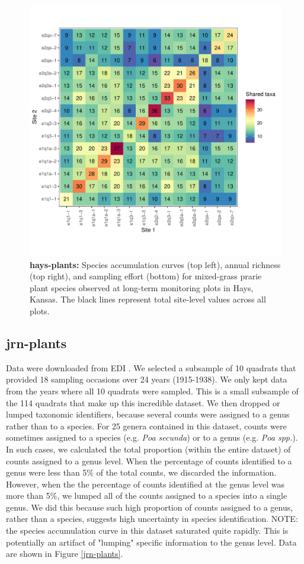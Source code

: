 \documentclass[11pt, oneside]{article}
\begin{document}
\begin{figure}[h!]
\includegraphics[scale = 0.4]{hays-plants-compagnoni_spp_shared.pdf}
\caption{{\bf hays-plants:} Species accumulation curves (top left),  annual richness (top right), and sampling effort (bottom)  for mixed-grass prarie plant species observed at long-term monitoring plots in Hays, Kansas. The black lines represent total site-level values across all plots.}
\label{hays-plants}
\end{figure}



\subsection{jrn-plants}
Data were downloaded from EDI \citep{jrn-plants}.
We selected a subsample of 10 quadrats that provided 18 sampling occasions over 24 years (1915-1938). We only kept data from the years where all 10 quadrats were sampled.
This is a small subsample of the 114 quadrats that make up this incredible dataset. 
We then dropped or lumped taxonomic identifiers, because several counts were assigned to a genus rather than to a species. 
For 25 genera contained in this dataset, counts were sometimes assigned to a species (e.g. \textit{Poa secunda}) or to a genus (e.g. \textit{Poa spp.}). 
In such cases, we calculated the total proportion (within the entire dataset) of counts assigned to a genus level. 
When the percentage of counts identified to a genus were less than 5$\%$ of the total counts, we discarded the information. 
However, when the the percentage of counts identified at the genus level was more than 5$\%$, we lumped all of the counts assigned to a species into a single genus. 
We did this because such high proportion of counts assigned to a genus, rather than a species, suggests high uncertainty in species identification.
NOTE: the species accumulation curve in this dataset saturated quite rapidly. This is potentially an artifact of "lumping" specific information to the genus level. 
Data are shown in Figure \ref{jrn-plants}.
\end{document}
